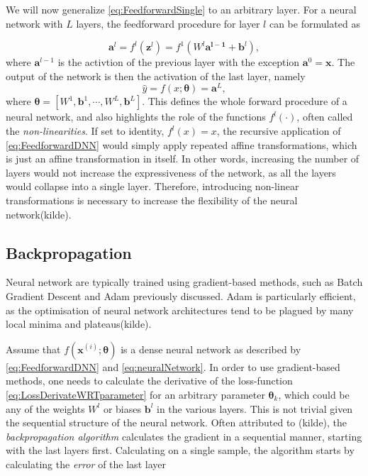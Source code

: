 We will now generalize \autoref{eq:FeedforwardSingle} to an arbitrary layer. For a neural network with $L$ layers, the feedforward procedure for layer $l$  can be formulated as 

\begin{equation}\label{eq:FeedforwardDNN}
    \boldsymbol{a}^l = f^l(\boldsymbol{z}^l) = f^1(W^l \boldsymbol{a^{l-1}} + \boldsymbol{b}^l),
\end{equation}
where $\boldsymbol{a}^{l-1}$ is the activtion of the previous layer with the exception $\boldsymbol{a}^{0} = \boldsymbol{x}$. The output of the network is then the activation of the last layer, namely 
\begin{equation}\label{eq:neuralNetwork}
    \hat{y} = f(x;\boldsymbol{\theta}) = \boldsymbol{a}^{L},
\end{equation}
where $\boldsymbol{\theta} = [W^1, \boldsymbol{b}^1, \cdots, W^L,  \boldsymbol{b}^L]$. This defines the whole forward procedure of a neural network, and also highlights the role of the functions $f^l(\cdot)$, often called the \emph{non-linearities}. If set to identity, $f^l(x) = x$, the recursive application of \autoref{eq:FeedforwardDNN} would simply apply repeated affine transformations, which is just an affine transformation in itself. In other words, increasing the number of layers would not increase the expressiveness of the network, as all the layers would collapse into a single layer. Therefore, introducing non-linear transformations is necessary to increase the flexibility of the neural network(kilde). 

\subsection{Backpropagation}\label{sec:BackpropogationDNN}

Neural network are typically trained using gradient-based methods, such as Batch Gradient Descent and Adam previously discussed. Adam is particularly efficient, as the optimisation of neural network architectures tend to be plagued by many local minima and plateaus(kilde).  

Assume that $f(\boldsymbol{x}^{(i)}; \boldsymbol{\theta})$ is a dense neural network as described by \autoref{eq:FeedforwardDNN} and \autoref{eq:neuralNetwork}. In order to use gradient-based methods, one needs to calculate the derivative of the loss-function \autoref{eq:LossDerivateWRTparameter} for an arbitrary parameter $\boldsymbol{\theta}_k$, which could be any of the weights $W^l$ or biases $\boldsymbol{b}^l$ in the various layers. This is not trivial given the sequential structure of the neural network. Often attributed to (kilde), the \emph{backpropagation algorithm} calculates the gradient in a sequential manner, starting with the last layers first. Calculating on a single sample, the algorithm starts by calculating the \emph{error} of the last layer


